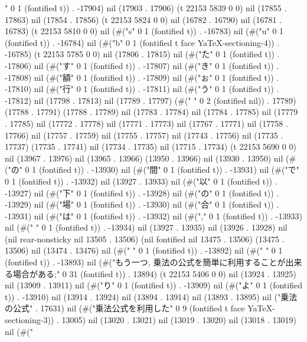" 0 1 (fontified t)) . -17904) nil (17903 . 17906) (t 22153 5839 0 0) nil (17855 . 17863) nil (17854 . 17856) (t 22153 5824 0 0) nil (16782 . 16790) nil (16781 . 16783) (t 22153 5810 0 0) nil (#("s" 0 1 (fontified t)) . -16783) nil (#("u" 0 1 (fontified t)) . -16784) nil (#("b" 0 1 (fontified t face YaTeX-sectioning-4)) . -16785) (t 22153 5785 0 0) nil (17806 . 17815) nil (#("た" 0 1 (fontified t)) . -17806) nil (#("す" 0 1 (fontified t)) . -17807) nil (#("き" 0 1 (fontified t)) . -17808) nil (#("額" 0 1 (fontified t)) . -17809) nil (#("ぉ" 0 1 (fontified t)) . -17810) nil (#("行" 0 1 (fontified t)) . -17811) nil (#("う" 0 1 (fontified t)) . -17812) nil (17798 . 17813) nil (17789 . 17797) (#("  " 0 2 (fontified nil)) . 17789) (17788 . 17791) (17788 . 17789) nil (17783 . 17784) nil (17784 . 17785) nil (17779 . 17785) nil (17772 . 17778) nil (17771 . 17773) nil (17767 . 17771) nil (17758 . 17766) nil (17757 . 17759) nil (17755 . 17757) nil (17743 . 17756) nil (17735 . 17737) (17735 . 17741) nil (17734 . 17735) nil (17715 . 17734) (t 22153 5690 0 0) nil (13967 . 13976) nil (13965 . 13966) (13950 . 13966) nil (13930 . 13950) nil (#("の" 0 1 (fontified t)) . -13930) nil (#("間" 0 1 (fontified t)) . -13931) nil (#("で" 0 1 (fontified t)) . -13932) nil (13927 . 13933) nil (#("以" 0 1 (fontified t)) . -13927) nil (#("下" 0 1 (fontified t)) . -13928) nil (#("の" 0 1 (fontified t)) . -13929) nil (#("場" 0 1 (fontified t)) . -13930) nil (#("合" 0 1 (fontified t)) . -13931) nil (#("は" 0 1 (fontified t)) . -13932) nil (#("," 0 1 (fontified t)) . -13933) nil (#(" " 0 1 (fontified t)) . -13934) nil (13927 . 13935) nil (13926 . 13928) nil (nil rear-nonsticky nil 13505 . 13506) (nil fontified nil 13475 . 13506) (13475 . 13506) nil (13474 . 13476) nil (#("
" 0 1 (fontified t)) . -13892) nil (#("
" 0 1 (fontified t)) . -13893) nil (#("もう一つ, 乗法の公式を簡単に利用することが出来る場合がある;" 0 31 (fontified t)) . 13894) (t 22153 5406 0 0) nil (13924 . 13925) nil (13909 . 13911) nil (#("り" 0 1 (fontified t)) . -13909) nil (#("よ" 0 1 (fontified t)) . -13910) nil (13914 . 13924) nil (13894 . 13914) nil (13893 . 13895) nil ("乗法の公式" . 17631) nil (#("乗法公式を利用した" 0 9 (fontified t face YaTeX-sectioning-3)) . 13005) nil (13020 . 13021) nil (13019 . 13020) nil (13018 . 13019) nil (#("

